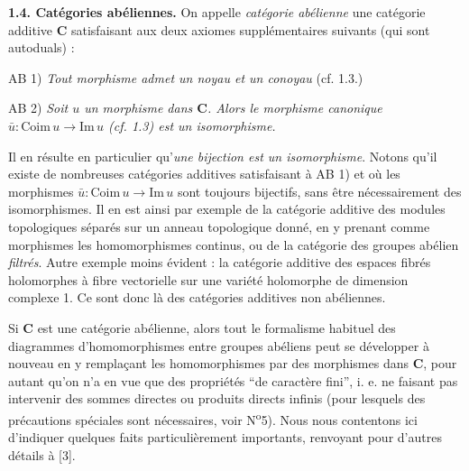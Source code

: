 
\noindent\textbf{1.4. Catégories abéliennes.}
On appelle \textit{catégorie abélienne} une catégorie additive $\mathbf{C}$
satisfaisant aux deux axiomes supplémentaires suivants (qui sont autoduals) :

\noindent AB 1) \textit{Tout morphisme admet un noyau et un conoyau}
(cf. 1.3.)

\noindent AB 2) \textit{Soit $u$ un morphisme dans $\mathbf{C}$. Alors le
morphisme canonique
$\bar u:\mathrm{Coim}\,u\to\mathrm{Im}\,u$ \textup{(cf. 1.3)} est un
isomorphisme.}

Il en résulte en particulier qu'\textit{une bijection est un isomorphisme}.
Notons qu'il existe de nombreuses catégories additives satisfaisant à AB 1) et
où les morphismes $\bar u:\mathrm{Coim}\,u\to\mathrm{Im}\,u$ sont
toujours bijectifs, sans être nécessairement des isomorphismes. Il en est ainsi
par exemple de la catégorie additive des modules topologiques séparés sur un
anneau topologique donné, en y prenant comme morphismes les homomorphismes
continus, ou de la catégorie des groupes abélien \textit{filtrés}. Autre
exemple moins évident : la catégorie additive des espaces fibrés holomorphes à
fibre vectorielle sur une variété holomorphe de dimension complexe 1. Ce sont
donc là des catégories additives non abéliennes.

Si $\mathbf{C}$ est une catégorie abélienne, alors tout le formalisme habituel des
diagrammes d'homomorphismes entre groupes abéliens peut se développer à
nouveau en y remplaçant les homomorphismes par des morphismes dans $\mathbf{C}$, pour
autant qu'on n'a en vue que des propriétés ``de caractère fini'', i. e. ne
faisant pas intervenir des sommes directes ou produits directs infinis (pour
lesquels des précautions spéciales sont nécessaires, voir
N\textsuperscript{o}5). Nous nous contentons ici d'indiquer quelques faits
particulièrement importants, renvoyant pour d'autres détails à [3].


